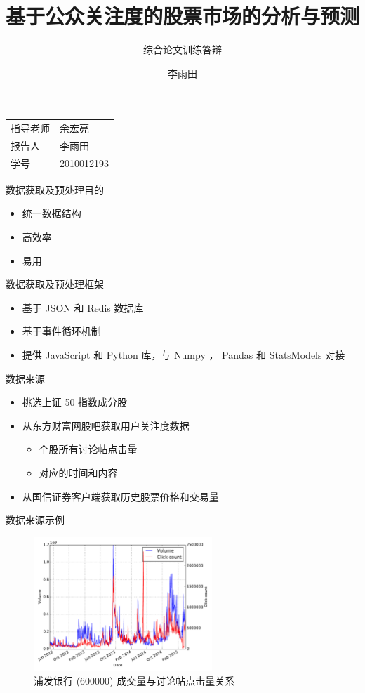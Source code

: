 \documentclass{beamer}
\title{基于公众关注度的股票市场的分析与预测}
\subtitle{综合论文训练答辩}
\author{李雨田}
\institute{清华大学}
\begin{document}
\begin{frame}
\titlepage
\begin{center}
  \begin{tabular}{ll}
    指导老师 & 余宏亮 \\
    报告人 & 李雨田 \\
    学号 & 2010012193
  \end{tabular}
\end{center}
\end{frame}

\begin{frame}{数据获取及预处理}{目的}
\begin{itemize}
  \item 统一数据结构
  \pause
  \item 高效率
  \pause
  \item 易用
\end{itemize}
\end{frame}

\begin{frame}{数据获取及预处理}{框架}
\begin{itemize}
  \item 基于 JSON 和 Redis 数据库
  \pause
  \item 基于事件循环机制
  \pause
  \item 提供 JavaScript 和 Python 库，与 Numpy ， Pandas 和 StatsModels 对接
\end{itemize}
\end{frame}

\begin{frame}{数据来源}
\begin{itemize}
  \item 挑选上证 50 指数成分股
  \pause
  \item 从东方财富网股吧获取用户关注度数据
  \begin{itemize}
    \item 个股所有讨论帖点击量
    \item 对应的时间和内容
  \end{itemize}
  \pause
  \item 从国信证券客户端获取历史股票价格和交易量
\end{itemize}
\end{frame}

\begin{frame}{数据来源}{示例}
\begin{figure}
  \includegraphics[width=0.6\textwidth]{plots/volume_and_click_count.pdf}
  \caption{浦发银行 (600000) 成交量与讨论帖点击量关系}
\end{figure}
\end{frame}
\end{document}
